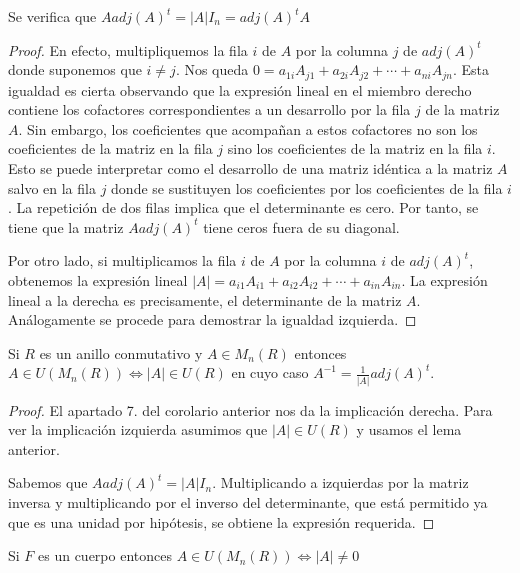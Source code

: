 \begin{lemma}
Se verifica que $A adj(A)^t = |A| I_n = adj(A)^t A$
\end{lemma}
\begin{proof}
En efecto, multipliquemos la fila $i$ de $A$ por la columna $j$ de $adj(A)^t$ donde suponemos que $i \neq j$. Nos queda $0 = a_{1i}A_{j1}+a_{2i}A_{j2}+\cdots+a_{ni}A_{jn}$. Esta igualdad es cierta observando que la expresión lineal en el miembro derecho contiene los cofactores correspondientes a un desarrollo por la fila $j$ de la matriz $A$. Sin embargo, los coeficientes que acompañan a estos cofactores no son los coeficientes de la matriz en la fila $j$ sino los coeficientes de la matriz en la fila $i$. Esto se puede interpretar como el desarrollo de una matriz idéntica a la matriz $A$ salvo en la fila $j$ donde se sustituyen los coeficientes por los coeficientes de la fila $i$. La repetición de dos filas implica que el determinante es cero. Por tanto, se tiene que la matriz $A adj(A)^t$ tiene ceros fuera de su diagonal.

Por otro lado, si multiplicamos la fila $i$ de $A$ por la columna $i$ de $adj(A)^t$, obtenemos la expresión lineal $|A| = a_{i1}A_{i1}+a_{i2}A_{i2}+\cdots+a_{in}A_{in}$. La expresión lineal a la derecha es precisamente, el determinante de la matriz $A$. Análogamente se procede para demostrar la igualdad izquierda. 
\end{proof}

\begin{proposition}
Si $R$ es un anillo conmutativo y $A \in M_n(R)$ entonces $A \in U(M_n(R)) \iff |A| \in U(R)$ en cuyo caso $A^{-1} = \frac{1}{|A|}adj(A)^t$.
\end{proposition}
\begin{proof}
El apartado 7. del corolario anterior nos da la implicación derecha. Para ver la implicación izquierda asumimos que $|A| \in U(R)$ y usamos el lema anterior.

Sabemos que $A adj(A)^t = |A| I_n$. Multiplicando a izquierdas por la matriz inversa y multiplicando por el inverso del determinante, que está permitido ya que es una unidad por hipótesis, se obtiene la expresión requerida. 
\end{proof}

\begin{corollary}
Si $F$ es un cuerpo entonces $A \in U(M_n(R)) \iff |A| \neq 0$
\end{corollary}

